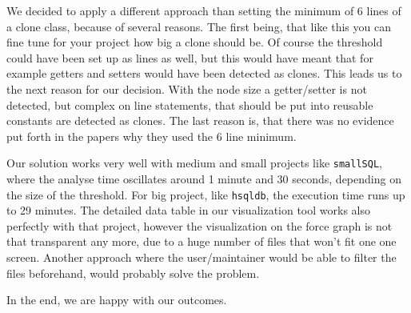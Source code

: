\documentclass{uva-inf-article}
\begin{document}
We decided to apply a different approach than setting the minimum of 6 lines of a clone class, because of several reasons. The first being, that like this you can fine tune for your project how big a clone should be. Of course the threshold could have been set up as lines as well, but this would have meant that for example getters and setters would have been detected as clones. This leads us to the next reason for our decision. With the node size a getter/setter is not detected, but complex on line statements, that should be put into reusable constants are detected as clones. The last reason is, that there was no evidence put forth in the papers why they used the 6 line minimum.

Our solution works very well with medium and small projects like \texttt{smallSQL}, where the analyse time oscillates around 1 minute and 30 seconds, depending on the size of the threshold. For big project, like \texttt{hsqldb}, the execution time runs up to 29 minutes. The detailed data table in our visualization tool works also perfectly with that project, however the visualization on the force graph is not that transparent any more, due to a huge number of files that won't fit one one screen. Another approach where the user/maintainer would be able to filter the files beforehand, would probably solve the problem. 

In the end, we are happy with our outcomes. 


\printbibliography


\end{document}

